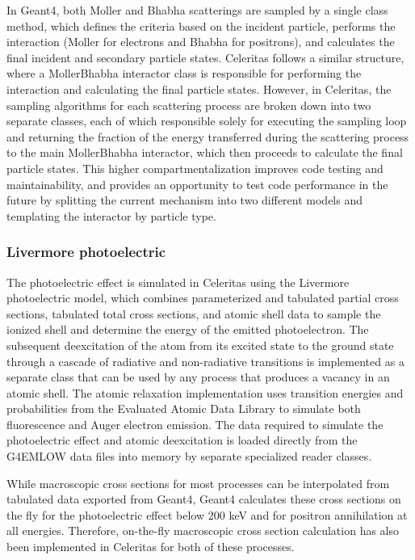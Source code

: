 In Geant4, both Moller and Bhabha scatterings are sampled by a single
class method, which defines the criteria based on the incident particle,
performs the interaction (Moller for electrons and Bhabha for positrons), and
calculates the final incident and secondary particle states. Celeritas
follows a similar structure, where a MollerBhabha interactor class is
responsible for performing the interaction and calculating the final particle
states. However, in Celeritas, the sampling algorithms for each scattering
process are broken down into two separate classes, each of which responsible
solely for executing the sampling loop and returning the fraction of the energy
transferred during the scattering process to the main MollerBhabha interactor,
which then proceeds to calculate the final particle states. This higher
compartmentalization improves code testing and maintainability, and provides
an opportunity to test code performance in the future by splitting the current
mechanism into two different models and templating the interactor by particle
type.

\subsubsection{Livermore photoelectric}

The photoelectric effect is simulated in Celeritas using the Livermore
photoelectric model, which combines parameterized and tabulated partial cross
sections, tabulated total cross sections, and atomic shell data to sample the
ionized shell and determine the energy of the emitted photoelectron. The
subsequent deexcitation of the atom from its excited state to the ground state
through a cascade of radiative and non-radiative transitions is implemented as
a separate class that can be used by any process that produces a vacancy in an
atomic shell. The atomic relaxation implementation uses transition energies and
probabilities from the Evaluated Atomic Data Library to simulate both
fluorescence and Auger electron emission. The data required to simulate the
photoelectric effect and atomic deexcitation is loaded directly from the
G4EMLOW data files into memory by separate specialized reader classes.

While macroscopic cross sections for most processes can be interpolated from
tabulated data exported from Geant4, Geant4 calculates these cross sections on
the fly for the photoelectric effect below 200 keV and for positron
annihilation at all energies. Therefore, on-the-fly macroscopic cross section
calculation has also been implemented in Celeritas for both of these processes.

